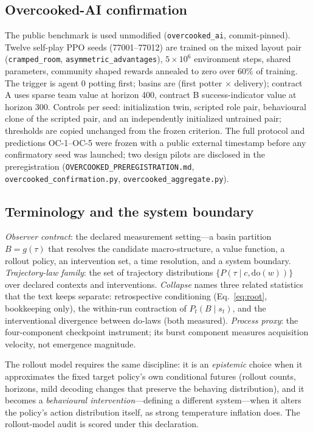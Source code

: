 \documentclass[11pt]{article}
\theoremstyle{definition}
\newcommand{\dO}[1]{\mathrm{do}(#1)}
\newcommand{\Ptb}{P_t(B \mid s_t)}
\begin{document}
\subsection*{Overcooked-AI confirmation}
The public benchmark is used unmodified (\texttt{overcooked\_ai},
commit-pinned). Twelve self-play PPO seeds (77001--77012) are trained
on the mixed layout pair (\texttt{cramped\_room},
\texttt{asymmetric\_advantages}), $5{\times}10^{6}$ environment
steps, shared parameters, community shaped rewards annealed to zero
over 60\% of training. The trigger is agent 0 potting first; basins
are (first potter $\times$ delivery); contract A uses sparse team
value at horizon 400, contract B success-indicator value at horizon
300. Controls per seed: initialization twin, scripted role pair,
behavioural clone of the scripted pair, and an independently
initialized untrained pair; thresholds are copied unchanged from the
frozen criterion. The full protocol and predictions OC-1--OC-5 were
frozen with a public external timestamp before any confirmatory seed
was launched; two design pilots are disclosed in the preregistration
(\texttt{OVERCOOKED\_PREREGISTRATION.md},
\texttt{overcooked\_confirmation.py},
\texttt{overcooked\_aggregate.py}).

\subsection*{Terminology and the system boundary}
\emph{Observer contract}: the declared measurement setting---a basin
partition $B=g(\tau)$ that resolves the candidate macro-structure, a
value function, a rollout policy, an intervention set, a time
resolution, and a system boundary. \emph{Trajectory-law family}: the
set of trajectory distributions $\{P(\tau \mid c, \dO{w})\}$ over
declared contexts and interventions. \emph{Collapse} names three
related statistics that the text keeps separate: retrospective
conditioning (Eq.~\ref{eq:root}, bookkeeping only), the within-run
contraction of $\Ptb$, and the interventional divergence between
do-laws (both measured). \emph{Process proxy}: the four-component
checkpoint instrument; its burst component measures acquisition
velocity, not emergence magnitude.

The rollout model requires the same discipline: it is an
\emph{epistemic} choice when it approximates the fixed target
policy's own conditional futures (rollout counts, horizons, mild
decoding changes that preserve the behaving distribution), and it
becomes a \emph{behavioural intervention}---defining a different
system---when it alters the policy's action distribution itself, as
strong temperature inflation does. The rollout-model audit is scored
under this declaration.
\end{document}
